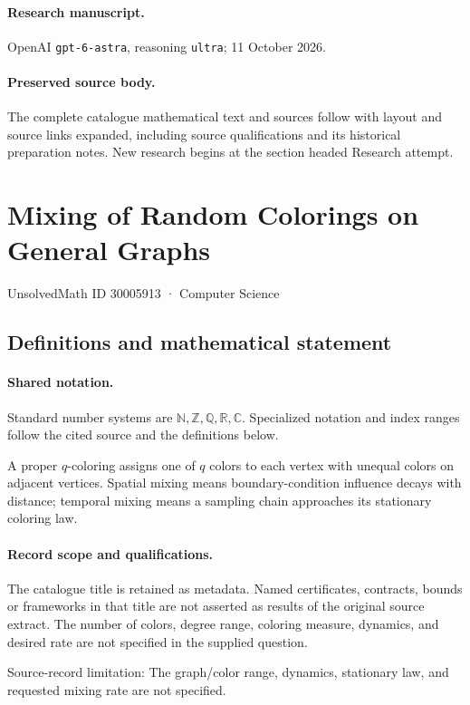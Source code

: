 \documentclass[11pt]{article}
\begin{document}
\paragraph{Research manuscript.} OpenAI \texttt{gpt-6-astra}, reasoning \texttt{ultra}; 11 October 2026.
\paragraph{Preserved source body.} The complete catalogue mathematical text and sources follow with layout and source links expanded, including source qualifications and its historical preparation notes. New research begins at the section headed Research attempt.

\section{Mixing of Random Colorings on General Graphs}\label{30005913}
{\small UnsolvedMath ID 30005913 · Computer Science}
\subsection{Definitions and mathematical statement}

\paragraph{Shared notation.}Standard number systems are $\mathbb N,\mathbb Z,\mathbb Q,\mathbb R,\mathbb C$. Specialized notation and index ranges follow the cited source and the definitions below.


A proper $q$-coloring assigns one of $q$ colors to each vertex with unequal colors on adjacent vertices. Spatial mixing means boundary-condition influence decays with distance; temporal mixing means a sampling chain approaches its stationary coloring law.
\paragraph{Record scope and qualifications.}
The catalogue title is retained as metadata. Named certificates, contracts, bounds or frameworks in that title are not asserted as results of the original source extract.
The number of colors, degree range, coloring measure, dynamics, and desired rate are not specified in the supplied question.

Source-record limitation: The graph/color range, dynamics, stationary law, and requested mixing rate are not specified.
\end{document}
